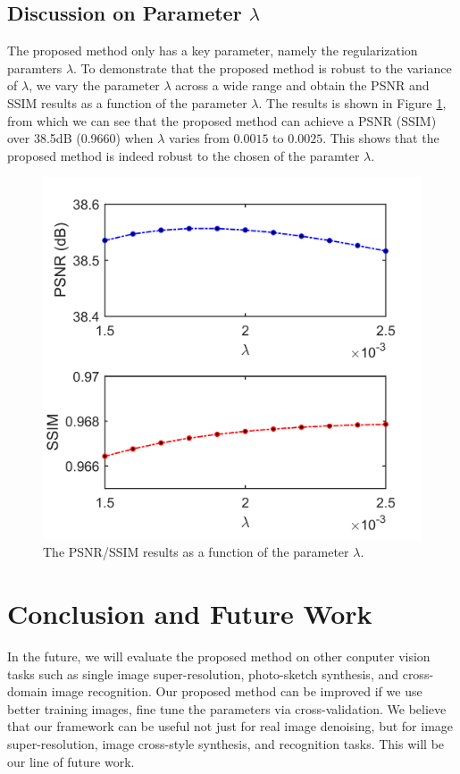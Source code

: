 \documentclass[10pt,twocolumn,letterpaper]{article}
\begin{document}
\subsection{Discussion on Parameter $\lambda$}
The proposed method only has a key parameter, namely the regularization paramters $\lambda$. To demonstrate that the proposed method is robust to the variance of $\lambda$, we vary the parameter $\lambda$ across a wide range and obtain the PSNR and SSIM results as a function of the parameter $\lambda$. The results is shown in Figure \ref{fig10}, from which we can see that the proposed method can achieve a PSNR (SSIM) over 38.5dB (0.9660) when $\lambda$ varies from $0.0015$ to $0.0025$. This shows that the proposed method is indeed robust to the chosen of the paramter $\lambda$.
\begin{figure}
\includegraphics[width=1\linewidth]{images/param.png}
\caption{The PSNR/SSIM results as a function of the parameter $\lambda$.}
\label{fig10}
\end{figure}

\section{Conclusion and Future Work}

In the future, we will evaluate the proposed method on other conputer vision tasks such as single image super-resolution, photo-sketch synthesis, and cross-domain image recognition. Our proposed method can be improved if we use better training images, fine tune the parameters via cross-validation. We believe that our framework can be useful not just for real image denoising, but for image super-resolution, image cross-style synthesis, and recognition tasks. This will be our line of future work.

{\small


}
\end{document}
